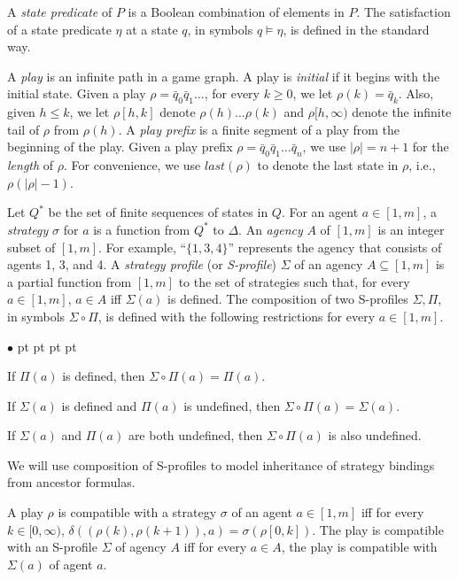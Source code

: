\documentclass[11pt]{article}
\newcommand{\emstp}{\textit{SP}}
\newcommand{\emlast}{\textit{last}}
\newenvironment{list1}{\begin{list}{$\bullet$}
{\topsep 0 pt \parsep 0 pt \partopsep 0 pt \itemsep 0 pt}}{\end{list}}
\begin{document}
A {\em state predicate} of $P$ is a Boolean combination of elements in $P$.
The satisfaction of a state predicate $\eta$ at a state $q$,
in symbols $q\models \eta$, is defined in the standard way.

A {\em play} is an infinite path in a game graph.
A play is {\em initial} if it begins with the initial state.
Given a play $\rho=\bar{q}_0\bar{q}_1\ldots$,
for every $k\geq 0$, we let $\rho(k)=\bar{q}_k$.
Also, given $h\leq k$,
we let $\rho[h,k]$ denote $\rho(h)\ldots\rho(k)$ and
$\rho[h,\infty)$ denote the infinite tail of $\rho$
from $\rho(h)$.
A {\em play prefix} is a finite segment of a play from the beginning of
the play.
Given a play prefix $\rho=\bar{q}_0\bar{q}_1\ldots \bar{q}_n$, 
we use $|\rho|=n+1$ for the {\em length} of $\rho$.
For convenience, we use $\emlast(\rho)$ to denote the 
last state in $\rho$, i.e., $\rho(|\rho|-1)$.  

Let $Q^*$ be the set of finite sequences of states in $Q$.  
For an agent $a\in [1,m]$,
a {\em strategy} $\sigma$ for $a$ is
a function from $Q^*$ to $\Delta$.
An {\em agency} $A$ of $[1,m]$ is an integer subset of $[1,m]$.  
For example, ``$\{1,3,4\}$'' represents the agency that consists of agents 1, 3, and 4. 
A {\em strategy profile} (or {\em S-profile}) $\Sigma$ of 
an agency $A\subseteq [1,m]$ 
is a partial function from $[1,m]$ to the set of strategies
such that, for every $a\in[1,m]$, 
$a\in A$ iff %
$\Sigma(a)$ is defined.  
The composition of two S-profiles $\Sigma,\Pi$,
in symbols $\Sigma\circ\Pi$, is defined with
the following restrictions for every $a\in[1,m]$.
\begin{list1}
\item If $\Pi(a)$ is defined,
    then $\Sigma\circ\Pi(a)=\Pi(a)$.
\item If $\Sigma(a)$ is defined and $\Pi(a)$ is undefined,
    then $\Sigma\circ\Pi(a)=\Sigma(a)$.
\item If $\Sigma(a)$ and $\Pi(a)$ are both undefined,
    then $\Sigma\circ\Pi(a)$ is also undefined.
\end{list1} 
We will use composition of S-profiles to model 
inheritance of strategy bindings from ancestor formulas. 

A play $\rho$ is compatible with a strategy
$\sigma$ of an agent $a\in [1,m]$
iff for every $k\in [0,\infty)$,
$\delta((\rho(k),\rho(k+1)),a)=\sigma(\rho[0,k])$.
The play is compatible with an S-profile $\Sigma$ of agency $A$
iff for every $a\in A$,
the play is compatible with $\Sigma(a)$ of agent $a$.
\end{document}
